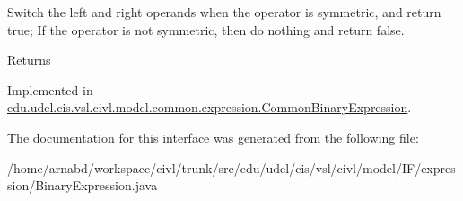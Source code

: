 Switch the left and right operands when the operator is symmetric, and return true; If the operator is not symmetric, then do nothing and return false. 

\begin{DoxyReturn}{Returns}

\end{DoxyReturn}


Implemented in \hyperlink{classedu_1_1udel_1_1cis_1_1vsl_1_1civl_1_1model_1_1common_1_1expression_1_1CommonBinaryExpression_a603fabad63ad890d667ec4961f8d8235}{edu.\+udel.\+cis.\+vsl.\+civl.\+model.\+common.\+expression.\+Common\+Binary\+Expression}.



The documentation for this interface was generated from the following file\+:\begin{DoxyCompactItemize}
\item 
/home/arnabd/workspace/civl/trunk/src/edu/udel/cis/vsl/civl/model/\+I\+F/expression/Binary\+Expression.\+java\end{DoxyCompactItemize}
